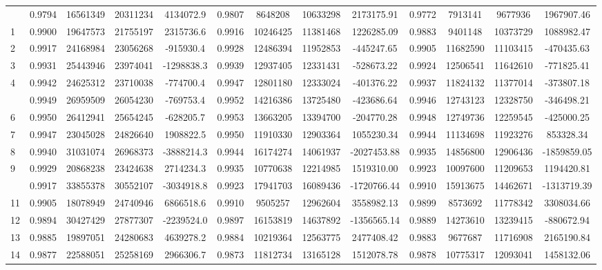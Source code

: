 \documentclass[
  12pt,
]{article}
\begin{document}
\begin{longtable}[t]{lcccccccccccc}
\endfoot
\bottomrule
\endlastfoot
0 & 0.9794 & 16561349 & 20311234 & 4134072.9 & 0.9807 & 8648208 & 10633298 & 2173175.91 & 0.9772 & 7913141 & 9677936 & 1967907.46\\
1 & 0.9900 & 19647573 & 21755197 & 2315736.6 & 0.9916 & 10246425 & 11381468 & 1226285.09 & 0.9883 & 9401148 & 10373729 & 1088982.47\\
2 & 0.9917 & 24168984 & 23056268 & -915930.4 & 0.9928 & 12486394 & 11952853 & -445247.65 & 0.9905 & 11682590 & 11103415 & -470435.63\\
3 & 0.9931 & 25443946 & 23974041 & -1298838.3 & 0.9939 & 12937405 & 12331431 & -528673.22 & 0.9924 & 12506541 & 11642610 & -771825.41\\
4 & 0.9942 & 24625312 & 23710038 & -774700.4 & 0.9947 & 12801180 & 12333024 & -401376.22 & 0.9937 & 11824132 & 11377014 & -373807.18\\
\addlinespace
5 & 0.9949 & 26959509 & 26054230 & -769753.4 & 0.9952 & 14216386 & 13725480 & -423686.64 & 0.9946 & 12743123 & 12328750 & -346498.21\\
6 & 0.9950 & 26412941 & 25654245 & -628205.7 & 0.9953 & 13663205 & 13394700 & -204770.28 & 0.9948 & 12749736 & 12259545 & -425000.25\\
7 & 0.9947 & 23045028 & 24826640 & 1908822.5 & 0.9950 & 11910330 & 12903364 & 1055230.34 & 0.9944 & 11134698 & 11923276 & 853328.34\\
8 & 0.9940 & 31031074 & 26968373 & -3888214.3 & 0.9944 & 16174274 & 14061937 & -2027453.88 & 0.9935 & 14856800 & 12906436 & -1859859.05\\
9 & 0.9929 & 20868238 & 23424638 & 2714234.3 & 0.9935 & 10770638 & 12214985 & 1519310.00 & 0.9923 & 10097600 & 11209653 & 1194420.81\\
\addlinespace
10 & 0.9917 & 33855378 & 30552107 & -3034918.8 & 0.9923 & 17941703 & 16089436 & -1720766.44 & 0.9910 & 15913675 & 14462671 & -1313719.39\\
11 & 0.9905 & 18078949 & 24740946 & 6866518.6 & 0.9910 & 9505257 & 12962604 & 3558982.13 & 0.9899 & 8573692 & 11778342 & 3308034.66\\
12 & 0.9894 & 30427429 & 27877307 & -2239524.0 & 0.9897 & 16153819 & 14637892 & -1356565.14 & 0.9889 & 14273610 & 13239415 & -880672.94\\
13 & 0.9885 & 19897051 & 24280683 & 4639278.2 & 0.9884 & 10219364 & 12563775 & 2477408.42 & 0.9883 & 9677687 & 11716908 & 2165190.84\\
14 & 0.9877 & 22588051 & 25258169 & 2966306.7 & 0.9873 & 11812734 & 13165128 & 1512078.78 & 0.9878 & 10775317 & 12093041 & 1458132.06\\

\end{longtable}
\end{document}
